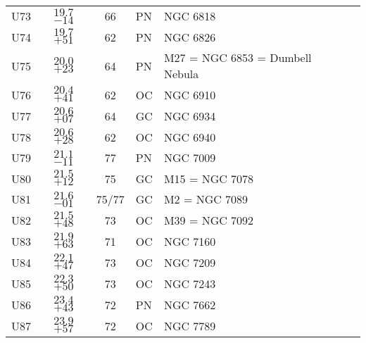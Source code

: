 \begin{table}[p]
\begin{tabular}{lcclll}
U73 &$19.7$ $-14$&66&PN &NGC 6818\\
U74 &$19.7$ $+51$&62&PN &NGC 6826\\
U75 &$20.0$ $+23$&64&PN &M27 = NGC 6853 = Dumbell Nebula\\
U76 &$20.4$ $+41$&62&OC &NGC 6910\\
U77 &$20.6$ $+07$&64&GC &NGC 6934\\
U78 &$20.6$ $+28$&62&OC &NGC 6940\\
U79 &$21.1$ $-11$&77&PN &NGC 7009\\
U80 &$21.5$ $+12$&75&GC &M15 = NGC 7078\\
U81 &$21.6$ $-01$&75/77&GC &M2 = NGC 7089\\
U82 &$21.5$ $+48$&73&OC &M39 = NGC 7092\\
U83 &$21.9$ $+63$&71&OC &NGC 7160\\
U84 &$22.1$ $+47$&73&OC &NGC 7209\\
U85 &$22.3$ $+50$&73&OC &NGC 7243\\
U86 &$23.4$ $+43$&72&PN &NGC 7662\\
U87 &$23.9$ $+57$&72&OC &NGC 7789\\
\hline
\end{tabular}
\end{table}

\clearpage

\twocolumn


\onecolumn
